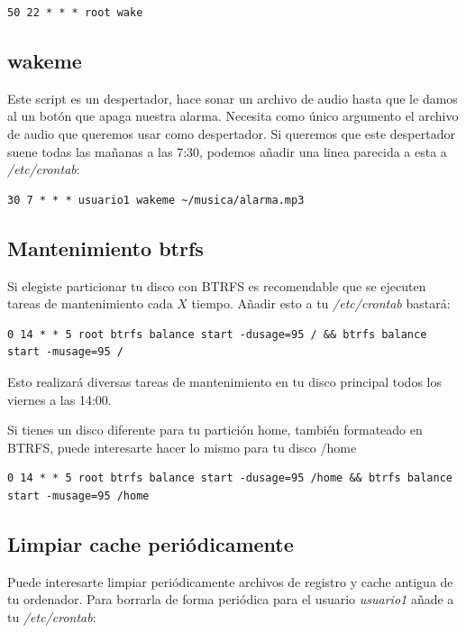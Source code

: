 \documentclass[12pt]{article}
\begin{document}
\begin{verbatim}
50 22 * * * root wake
\end{verbatim}

\subsection{wakeme}

Este script es un despertador, hace sonar un archivo de audio hasta que le damos al un botón que apaga nuestra alarma. Necesita como único argumento el archivo de audio que queremos usar como despertador. Si queremos que este despertador suene todas las mañanas a las 7:30, podemos añadir una linea parecida a esta a \emph{/etc/crontab}:

\begin{verbatim}
30 7 * * * usuario1 wakeme ~/musica/alarma.mp3
\end{verbatim}

\subsection{Mantenimiento btrfs}

Si elegiste particionar tu disco con BTRFS es recomendable que se ejecuten tareas de mantenimiento cada $X$ tiempo. Añadir esto a tu \emph{/etc/crontab} bastará:

\begin{lstlisting}[basicstyle=\scriptsize\ttfamily]
0 14 * * 5 root btrfs balance start -dusage=95 / && btrfs balance start -musage=95 /
\end{lstlisting}

Esto realizará diversas tareas de mantenimiento en tu disco principal todos los viernes a las 14:00.

Si tienes un disco diferente para tu partición home, también formateado en BTRFS, puede interesarte hacer lo mismo para tu disco /home

\begin{lstlisting}[basicstyle=\scriptsize\ttfamily]
0 14 * * 5 root btrfs balance start -dusage=95 /home && btrfs balance start -musage=95 /home
\end{lstlisting}

\subsection{Limpiar cache periódicamente}

Puede interesarte limpiar periódicamente archivos de registro y cache antigua de tu ordenador. Para borrarla de forma periódica para el usuario \emph{usuario1} añade a tu \emph{/etc/crontab}:
\end{document}
